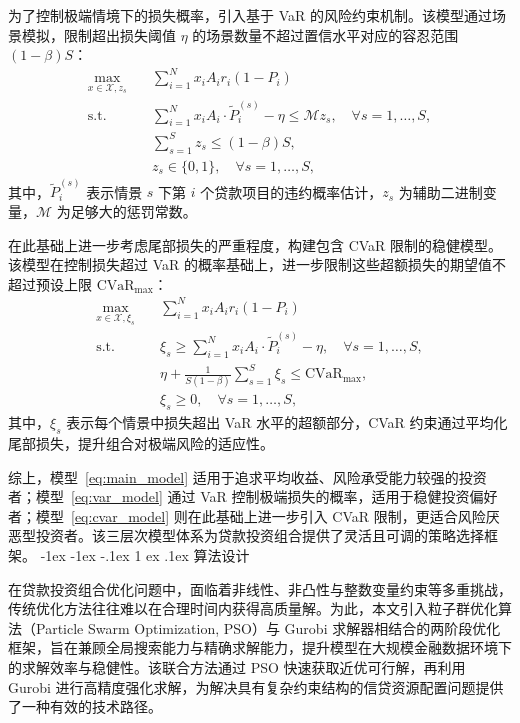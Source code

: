 \documentclass{write_paper}
\makeatletter
\renewcommand\section{\@startsection {section}{1}{\z@}%
                                   {-1ex \@plus -1ex \@minus -.1ex}%
                                   {1 ex \@plus.1ex}%
                                   {\normalfont\large\bfseries}}
\makeatother
\begin{document}
为了控制极端情境下的损失概率，引入基于 VaR 的风险约束机制。该模型通过场景模拟，限制超出损失阈值 $\eta$ 的场景数量不超过置信水平对应的容忍范围 $(1 - \beta)S$：
\begin{equation}
\begin{aligned}
\max_{x\in\mathcal{X},z_s} \quad & \sum_{i=1}^N x_i A_i r_i(1 - P_i) \\
\text{s.t.} \quad
& \sum_{i=1}^N x_i A_i \cdot \tilde{P}_i^{(s)} - \eta \le \mathcal{M} z_s, \quad \forall s = 1,\dots,S, \\
& \sum_{s=1}^S z_s \le (1 - \beta) S, \\
& z_s \in \{0,1\}, \quad \forall s = 1,\dots,S,
\end{aligned}
\label{eq:var_model}
\tag{P2P-VaR}
\end{equation}
其中，$\tilde{P}_i^{(s)}$ 表示情景 $s$ 下第 $i$ 个贷款项目的违约概率估计，$z_s$ 为辅助二进制变量，$\mathcal{M}$ 为足够大的惩罚常数。

在此基础上进一步考虑尾部损失的严重程度，构建包含 CVaR 限制的稳健模型。该模型在控制损失超过 VaR 的概率基础上，进一步限制这些超额损失的期望值不超过预设上限 $\text{CVaR}_{\max}$：
\begin{equation}
\begin{aligned}
\max_{x\in\mathcal{X},\xi_s} \quad & \sum_{i=1}^N x_i A_i r_i(1 - P_i) \\
\text{s.t.} \quad
& \xi_s \ge \sum_{i=1}^N x_i A_i \cdot \tilde{P}_i^{(s)} - \eta, \quad \forall s = 1,\dots,S, \\
& \eta + \frac{1}{S(1 - \beta)} \sum_{s=1}^S \xi_s \le \text{CVaR}_{\max}, \\
& \xi_s \ge 0, \quad \forall s = 1,\dots,S,
\end{aligned}
\label{eq:cvar_model}
\tag{P2P-CVaR}
\end{equation}
其中，$\xi_s$ 表示每个情景中损失超出 VaR 水平的超额部分，CVaR 约束通过平均化尾部损失，提升组合对极端风险的适应性。

综上，模型~\eqref{eq:main_model} 适用于追求平均收益、风险承受能力较强的投资者；模型~\eqref{eq:var_model} 通过 VaR 控制极端损失的概率，适用于稳健投资偏好者；模型~\eqref{eq:cvar_model} 则在此基础上进一步引入 CVaR 限制，更适合风险厌恶型投资者。该三层次模型体系为贷款投资组合提供了灵活且可调的策略选择框架。
\section{算法设计}

在贷款投资组合优化问题中，面临着非线性、非凸性与整数变量约束等多重挑战，传统优化方法往往难以在合理时间内获得高质量解。为此，本文引入粒子群优化算法（Particle Swarm Optimization, PSO）与 Gurobi 求解器相结合的两阶段优化框架，旨在兼顾全局搜索能力与精确求解能力，提升模型在大规模金融数据环境下的求解效率与稳健性。该联合方法通过 PSO 快速获取近优可行解，再利用 Gurobi 进行高精度强化求解，为解决具有复杂约束结构的信贷资源配置问题提供了一种有效的技术路径。
\end{document}
